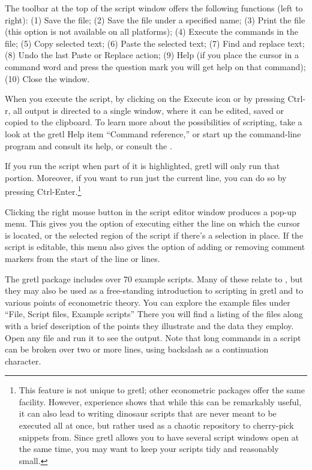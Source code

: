 The toolbar at the top of the script window offers the following
functions (left to right): (1) Save the file; (2) Save the file under
a specified name; (3) Print the file (this option is not available on
all platforms); (4) Execute the commands in the file; (5) Copy
selected text; (6) Paste the selected text; (7) Find and replace text;
(8) Undo the last Paste or Replace action; (9) Help (if you place the
cursor in a command word and press the question mark you will get help
on that command); (10) Close the window.

When you execute the script, by clicking on the Execute icon or by
pressing Ctrl-r, all output is directed to a single window, where it
can be edited, saved or copied to the clipboard.  To learn more about
the possibilities of scripting, take a look at the gretl Help
item ``Command reference,'' or start up the command-line program
 and consult its help, or consult the \GCR.

If you run the script when part of it is highlighted, gretl will
only run that portion. Moreover, if you want to run just the current
line, you can do so by pressing Ctrl-Enter.\footnote{This feature is
  not unique to gretl; other econometric packages offer the same
  facility. However, experience shows that while this can be
  remarkably useful, it can also lead to writing dinosaur scripts that
  are never meant to be executed all at once, but rather used as a
  chaotic repository to cherry-pick snippets from. Since gretl
  allows you to have several script windows open at the same time, you
  may want to keep your scripts tidy and reasonably small.}

Clicking the right mouse button in the script editor window produces a
pop-up menu.  This gives you the option of executing either the line
on which the cursor is located, or the selected region of the script
if there's a selection in place.  If the script is editable, this menu
also gives the option of adding or removing comment markers from the
start of the line or lines.

The gretl package includes over 70 example scripts.  Many
of these relate to \cite{ramanathan02}, but they may also be used as a
free-standing introduction to scripting in gretl and to various
points of econometric theory.  You can explore the example files
under ``File, Script files, Example scripts'' There you will find a
listing of the files along with a brief description of the points they
illustrate and the data they employ.  Open any file and run it to see
the output.  Note that long commands in a script can be broken over
two or more lines, using backslash as a continuation character.

